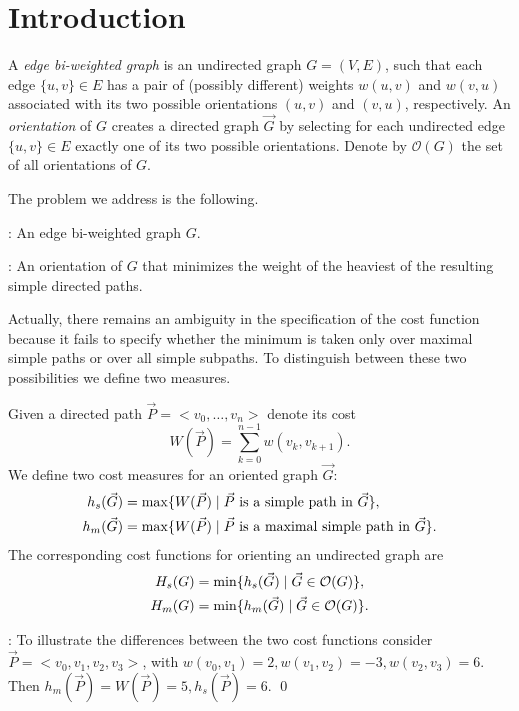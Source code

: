 \section{Introduction}

A \emph{edge bi-weighted graph} is an undirected graph $G = (V, E)$, such that each edge $\{u, v\} \in E$ has a pair of (possibly different) weights $w(u, v)$ and $w(v, u)$ associated with its two possible orientations $(u, v)$ and $(v, u)$, respectively. An \emph{orientation} 
of $G$ creates a directed graph $\vec{G}
$ 
by selecting for each undirected edge $\{u, v\} \in E$ exactly one of its two possible orientations. Denote by $\mathcal{O}(G)$ the set of all orientations of $G$. 

The problem we address is the following.

: An edge bi-weighted graph $G$.

: An orientation  of $G$ that minimizes the weight of 
the heaviest of the resulting simple directed paths.

Actually, there remains an ambiguity in the specification of the cost function because it 
fails to specify whether the minimum is taken only over maximal 
simple paths or over all simple subpaths. To distinguish between these two possibilities we define two measures.

\begin{definition}
	Given a directed path $\vec{P}=<v_0,\ldots,v_n>$ denote its cost
	\begin{equation}\label{eq.W}
		W(\vec{P})=\sum_{k=0}^{n-1} w(v_k,v_{k+1}).
	\end{equation}
	We define two cost measures for an oriented graph $\vec{G}$:
	\begin{align} 
		h_s(\vec{G}) &= \max\{W(\vec{P})\mid \vec{P} \mbox{ is a simple path in }\vec{G} \},\label{eq.hs} \\
		h_m(\vec{G}) &= \max\{W(\vec{P})\mid \vec{P} \mbox{ is a maximal simple path in }\vec{G} \}.
	\end{align}
	The corresponding cost functions for orienting an undirected graph are 
	\begin{align}
		H_s(G) &= \min\{h_s(\vec{G})\mid \vec{G} \in \mathcal{O}(G)\}, \\
		H_m(G) &= \min\{h_m(\vec{G})\mid \vec{G} \in \mathcal{O}(G)\}.
	\end{align}
\end{definition}

: To illustrate the differences between the two cost functions consider
 $\vec{P}=<v_0,v_1,v_2,v_3>$, with $w(v_0,v_1)=2, w(v_1,v_2)=-3,w(v_2,v_3)=6$.
 Then $h_m(\vec{P})=W(\vec{P})=5, h_s(\vec{P})=6$.
 \qed

